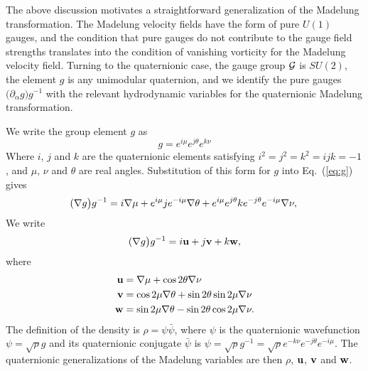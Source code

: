 \documentclass[a4paper,aps,prd,preprint,groupedaddress]{revtex4}
\newcommand{\bfu}{{\bf u}}
\newcommand{\bfv}{{\bf v}}
\newcommand{\bfw}{{\bf w}}
\begin{document}
The above discussion motivates a straightforward generalization of the Madelung transformation. The Madelung velocity fields have the form of pure $U(1)$ gauges, and the condition that pure gauges do not contribute to the gauge field strengths translates into the condition of vanishing vorticity for the Madelung velocity field. Turning to the quaternionic case, the gauge group ${\cal G}$ is $SU(2)$, the element $g$ is any unimodular quaternion, and we identify the pure gauges $\bigl(\partial_\alpha g\bigr)g^{-1}$ with the relevant hydrodynamic variables for the quaternionic Madelung transformation.

We write the group element $g$ as
\begin{equation}\label{eq:g}
g=  e^{i\mu}e^{j\theta} e^{k\nu}
\end{equation}
Where $i$, $j$ and $k$ are the quaternionic elements satisfying $i^2=j^2=k^2=ijk=-1$, and $\mu$, $\nu$ and $\theta$ are real angles. Substitution of this form for $g$ into Eq.~(\ref{eq:g}) gives
\begin{equation}
(\nabla g\bigr)g^{-1} = i\nabla \mu + e^{i\mu}j e^{-i\mu} \nabla\theta
+ e^{i\mu}e^{j\theta}k e^{-j\theta}e^{-i\mu}\nabla\nu,\\
\end{equation}
We write
\begin{equation}
(\nabla g\bigr)g^{-1} = i\bfu +j\bfv +k\bfw,
\end{equation}
where
\begin{equation}\label{eq:uvw}
\begin{split}
\bfu  &= \nabla\mu + \cos 2\theta \nabla\nu\\
\bfv  &= \cos 2\mu \nabla\theta
+ \sin 2\theta \sin 2\mu\nabla\nu\\
\bfw  &= \sin 2\mu \nabla\theta
- \sin 2\theta \cos 2\mu\nabla\nu.\\
\end{split}
\end{equation}
The definition of the density is $\rho=\psi\bar\psi$, where $\psi$ is the quaternionic wavefunction $\psi=\sqrt\rho g$ and its quaternionic conjugate $\bar\psi$ is $\psi=\sqrt\rho g^{-1}=\sqrt\rho e^{-k\nu}e^{-j\theta}e^{-i\mu}$.  The quaternionic generalizations of the Madelung variables are then $\rho$, $\bfu$, $\bfv$ and $\bfw$. 
\end{document}
